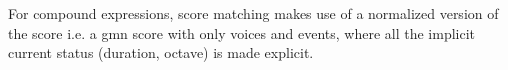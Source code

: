 \documentclass[10pt,a4paper,frenchb]{article}
\begin{document}
For compound expressions, score matching makes use of a normalized version of the score i.e. a gmn score with only voices and events, where all the implicit current status (duration, octave) is made explicit. 




\end{document}
